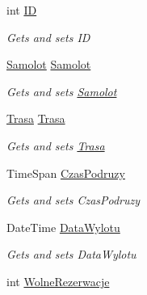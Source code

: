 \begin{DoxyCompactItemize}
\item 
int \mbox{\hyperlink{class_silnik_1_1_lot_afa780f21019d3396c86f1d0e67a0a02a}{ID}}
\begin{DoxyCompactList}\small\item\em Gets and sets ID \end{DoxyCompactList}\item 
\mbox{\hyperlink{class_silnik_1_1_samolot}{Samolot}} \mbox{\hyperlink{class_silnik_1_1_lot_ad8823384ab258305bbc2dd1baee4eadd}{Samolot}}
\begin{DoxyCompactList}\small\item\em Gets and sets \mbox{\hyperlink{class_silnik_1_1_samolot}{Samolot}} \end{DoxyCompactList}\item 
\mbox{\hyperlink{class_silnik_1_1_trasa}{Trasa}} \mbox{\hyperlink{class_silnik_1_1_lot_a665ef105afa7a29ee7870c720b762d6e}{Trasa}}
\begin{DoxyCompactList}\small\item\em Gets and sets \mbox{\hyperlink{class_silnik_1_1_trasa}{Trasa}} \end{DoxyCompactList}\item 
Time\+Span \mbox{\hyperlink{class_silnik_1_1_lot_a7a4e0de2fff28c39b2f81a330235d1bd}{Czas\+Podruzy}}
\begin{DoxyCompactList}\small\item\em Gets and sets Czas\+Podruzy \end{DoxyCompactList}\item 
Date\+Time \mbox{\hyperlink{class_silnik_1_1_lot_abff1662fa3776aab3d8889374bfb85f2}{Data\+Wylotu}}
\begin{DoxyCompactList}\small\item\em Gets and sets Data\+Wylotu \end{DoxyCompactList}\item 
int \mbox{\hyperlink{class_silnik_1_1_lot_af5d78c458695021ff86158728209c31b}{Wolne\+Rezerwacje}}

\end{DoxyCompactItemize}
